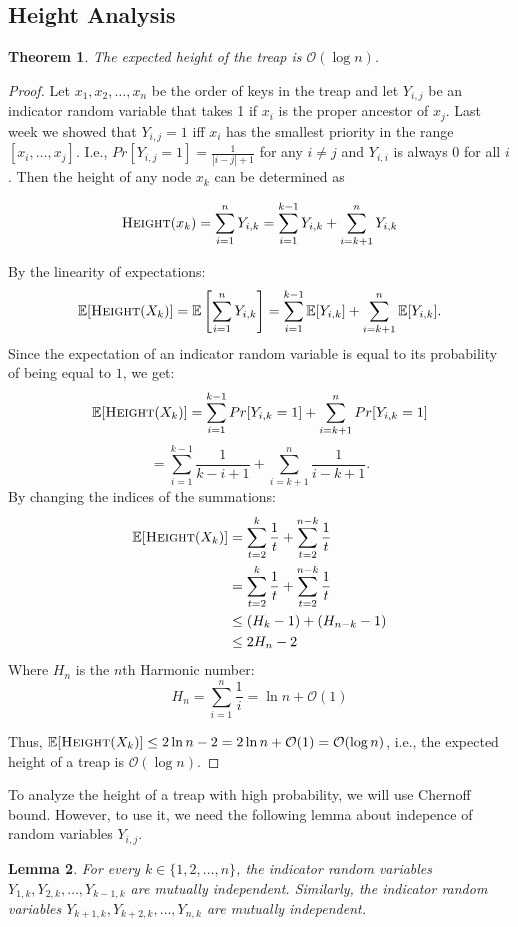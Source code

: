\documentclass[11pt]{article}
\newtheorem{theorem}{Theorem}
\newtheorem{lemma}[theorem]{Lemma}
\begin{document}
\subsection{Height Analysis}
\begin{theorem}
The expected height of the treap is $\mathcal{O}(\log n)$.
\end{theorem}
\begin{proof}
Let ${x_1,x_2,\ldots,x_n}$ be the order of keys in the treap and let $Y_{i,j}$ be an indicator random variable that takes 1 if $x_i$ is the proper ancestor of $x_j$. Last week we showed that $Y_{i,j}=1$ iff $x_i$ has the smallest priority in the range $[x_i,\ldots, x_j]$. I.e., $Pr[Y_{i,j} = 1] = \frac{1}{|i-j|+1}$ for any $i \ne j$ and $Y_{i,i}$ is always $0$ for all $i$. Then the height of any node $x_k$  can be determined as

\[\Call{Height}{x_k}=\sum_{i=1}^n Y_{i,k}=\sum_{i=1}^{k-1} Y_{i,k}+\sum_{i=k+1}^n Y_{i,k}\]

By the linearity of expectations: 
\[
\mathbb{E}[\Call{Height}{X_k}]=\mathbb{E}\left[\sum_{i=1}^n Y_{i,k}\right]=\sum_{i=1}^{k-1} \mathbb{E}[Y_{i,k}]+\sum_{i=k+1}^n \mathbb{E}[Y_{i,k}].
\]
 Since the expectation of an indicator random variable is equal to its probability of being equal to $1$, we get:
 \[
 \mathbb{E}[\Call{Height}{X_k}]=\sum_{i=1}^{k-1} Pr[Y_{i,k}=1]+\sum_{i=k+1}^n Pr[Y_{i,k}=1]
 \]
\[
=\sum_{i=1}^{k-1} \frac{1}{k-i+1} +\sum_{i=k+1}^n \frac{1}{i-k+1}.
\]
By changing the indices of the summations: 
\begin{align*}
\mathbb{E}[\Call{Height}{X_k}]&=\sum_{t=2}^{k} \frac{1}{t} +\sum_{t=2}^{n-k} \frac{1}{t} \\
&=\sum_{t=2}^{k} \frac{1}{t} +\sum_{t=2}^{n-k} \frac{1}{t} \\
&\leq (H_k-1)+(H_{n-k}-1)\\
&\leq 2H_n -2
\end{align*}
Where $H_n$ is the $n$th Harmonic number:
\[
H_n=\sum_{i=1}^n\frac{1}{i}=\ln{n}+\mathcal{O}(1)
\]

Thus, $\mathbb{E}[\Call{Height}{X_k}] \le 2\ln n -2 = 2\ln n + \mathcal{O}(1) = \mathcal{O}(\log n)$, i.e., the expected height of a treap is $\mathcal{O}(\log n)$.
\end{proof}
To analyze the height of a treap with high probability, we will use Chernoff bound. However, to use it, we need the following lemma about indepence of random variables $Y_{i,j}$.
\begin{lemma}
For every $k\in\{1,2,\ldots,n\}$, the indicator random variables $Y_{1,k},Y_{2,k},\ldots,Y_{k-1,k}$ are mutually independent. Similarly, the indicator random variables  $Y_{k+1,k},Y_{k+2,k},\ldots,Y_{n,k}$ are mutually independent.
\end{lemma}
\end{document}
